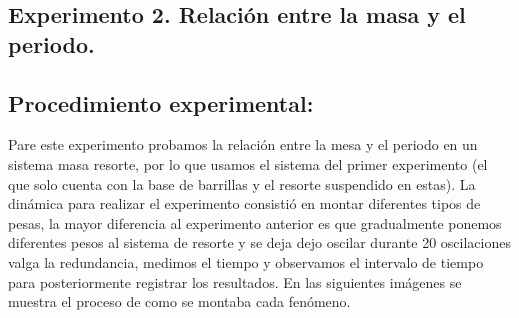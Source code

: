 \documentclass[10pt]{article}
\begin{document}
\begin{multicols}{2}
\section{Experimento 2. Relación entre la masa y el periodo.}
\subsection*{Procedimiento experimental:}
Pare este experimento probamos la relación entre la mesa y el periodo en un sistema masa resorte, por lo que usamos el sistema del primer experimento (el que solo cuenta con la base de barrillas y el resorte suspendido en estas).
La dinámica para realizar el experimento consistió en montar diferentes tipos de pesas, la mayor diferencia al experimento anterior es que gradualmente ponemos diferentes pesos al sistema de resorte y se deja dejo oscilar durante 20 oscilaciones valga la redundancia, medimos el tiempo y observamos el intervalo de tiempo para posteriormente registrar los resultados. En las siguientes imágenes se muestra el proceso de como se montaba cada fenómeno.


\end{multicols}
\end{document}
